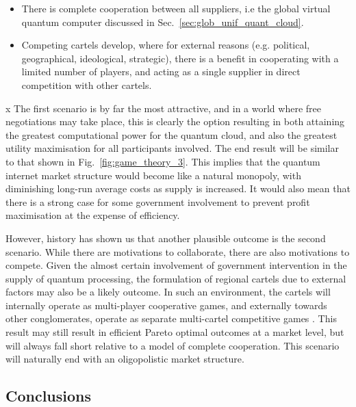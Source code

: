 \begin{itemize}
	\item There is complete cooperation between all suppliers, i.e the global virtual quantum computer discussed in Sec.~\ref{sec:glob_unif_quant_cloud}.
	\item Competing cartels develop, where for external reasons (e.g. political, geographical, ideological, strategic), there is a benefit in cooperating with a limited number of players, and acting as a single supplier in direct competition with other cartels.
\end{itemize}
x
The first scenario is by far the most attractive, and in a world where free negotiations may take place, this is clearly the option resulting in both attaining the greatest computational power for the quantum cloud, and also the greatest utility maximisation for all participants involved. The end result will be similar to that shown in Fig.~\ref{fig:game_theory_3}. This implies that the quantum internet market structure would become like a natural monopoly, with diminishing long-run average costs as supply is increased. It would also mean that there is a strong case for some government involvement to prevent profit maximisation at the expense of efficiency.

However, history has shown us that another plausible outcome is the second scenario. While there are motivations to collaborate, there are also motivations to compete. Given the almost certain involvement of government intervention in the supply of quantum processing, the formulation of regional cartels due to external factors may also be a likely outcome. In such an environment, the cartels will internally operate as multi-player cooperative games, and externally towards other conglomerates, operate as separate multi-cartel competitive games \cite{bib:Bacharach76}. This result may still result in efficient Pareto optimal outcomes at a market level, but will always fall short relative to a model of complete cooperation. This scenario will naturally end with an oligopolistic market structure. 

\subsection{Conclusions}

